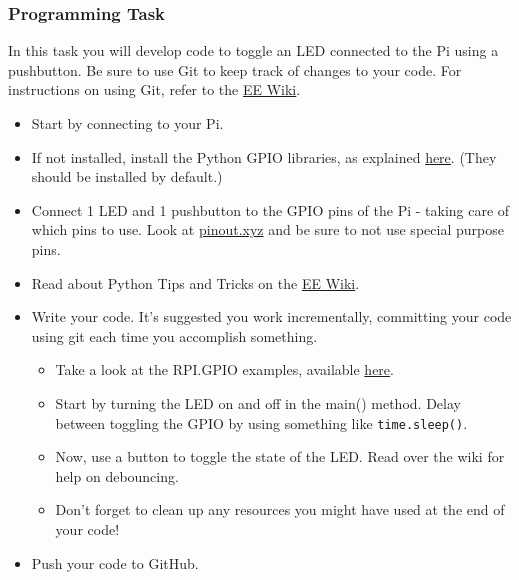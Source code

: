 \subsubsection{Programming Task}
In this task you will develop code to toggle an LED connected to the Pi using a pushbutton.
Be sure to use Git to keep track of changes to your code. For instructions on using Git, refer to the \href{http://wiki.ee.uct.ac.za/Git}{EE Wiki}.
\begin{itemize}
\itemsep0em 
    \item Start by connecting to your Pi.
    \item If not installed, install the Python GPIO libraries, as explained \href{https://pythonhosted.org/RPIO/}{here}. (They should be installed by default.)
    \item Connect 1 LED and 1 pushbutton to the GPIO pins of the Pi - taking care of which pins to use. Look at \href{pinout.xyz}{pinout.xyz} and be sure to not use special purpose pins.
    \item Read about Python Tips and Tricks on the \href{http://wiki.ee.uct.ac.za/RaspberryPi:ProgrammingInPython}{EE Wiki}.
    \item Write your code. It's suggested you work incrementally, committing your code using git each time you accomplish something. 
    \begin{itemize}
        \item Take a look at the RPI.GPIO examples, available \href{https://sourceforge.net/p/raspberry-gpio-python/wiki/Examples/}{here}.
        \item Start by turning the LED on and off in the main() method. Delay between toggling the GPIO by using something like \verb|time.sleep()|.
        \item Now, use a button to toggle the state of the LED. Read over the wiki for help on debouncing.
        \item Don't forget to clean up any resources you might have used at the end of your code!
    \end{itemize}
    \item Push your code to GitHub.
\end{itemize}

